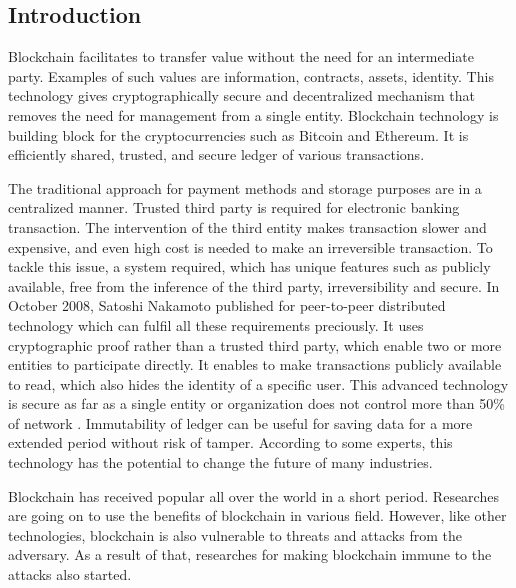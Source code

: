 \documentclass[a4paper,twoside,12pt]{report}
\begin{document}
\begin{spacing}{1.5}
\chapter{Introduction}
Blockchain facilitates to transfer value without the need for an intermediate party. Examples of such values are information, contracts, assets, identity. This technology gives cryptographically secure and decentralized mechanism that removes the need for management from a single entity. Blockchain technology is building block for the cryptocurrencies such as Bitcoin and Ethereum. It is efficiently shared, trusted, and secure ledger of various transactions.  
\par
The traditional approach for payment methods and storage purposes are in a centralized manner. Trusted third party is required for electronic banking transaction. The intervention of the third entity makes transaction slower and expensive, and even high cost is needed to make an irreversible transaction. To tackle this issue,  a system required, which has unique features such as publicly available, free from the inference of the third party, irreversibility and secure. In October 2008, Satoshi Nakamoto published for peer-to-peer distributed technology which can fulfil all these requirements preciously. It uses cryptographic proof rather than a trusted third party, which enable two or more entities to participate directly. It enables to make transactions publicly available to read, which also hides the identity of a specific user. This advanced technology is secure as far as a single entity or organization does not control more than 50\% of network \cite{satoshinakamoto}. Immutability of ledger can be useful for saving data for a more extended period without risk of tamper. According to some experts, this technology has the potential to change the future of many industries.
\par
Blockchain has received popular all over the world in a short period. Researches are going on to use the benefits of blockchain in various field. However, like other technologies, blockchain is also vulnerable to threats and attacks from the adversary. As a result of that, researches for making blockchain immune to the attacks also started.         

\end{spacing}
\end{document}
